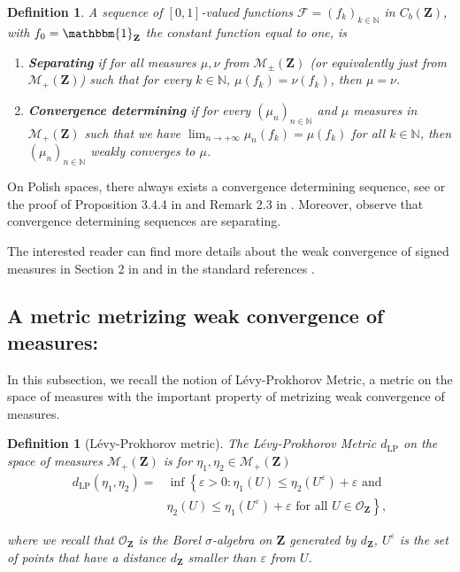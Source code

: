 \documentclass[11pt]{article}
\newtheorem{definition}[theorem]{Definition}
\def\N{\mathbb{N}}
\newcommand{\Space}{\mathbf{Z}}
\newcommand{\Topo}{\mathcal{O}_\Space}
\newcommand{\Meas}{\mathcal{M}_+(\Space)}
\newcommand{\SignedMeas}{\mathcal{M}_{\pm}(\Space)}
\newcommand{\CbFunct}{C_b(\Space)}
\newcommand{\F}{\mathcal{F}}
\newcommand{\un}{\mathbbm{1}}
\begin{document}
\begin{definition}
    A sequence of $[0,1]$-valued functions $\F = (f_k )_{k\in\N}$ in $\CbFunct$, with $f_0=\un_{\mathbf{Z}}$ the constant function equal to one, is    
\begin{enumerate}
\item  \textbf{Separating}   if  for all measures $\mu,\nu$ from $\SignedMeas$ (or equivalently just from  $\Meas$) such that for every $k\in\N$, $\mu(f_k) = \nu(f_k)$, then $\mu = \nu$.
 \item  \textbf{Convergence determining}  if   for  every $(\mu_n)_{n\in\N}$  and  $\mu$   measures  in  $\Meas$  such  that we have $\lim_{n\to +\infty} \mu_n(f_k)  = \mu(f_k)$ for all $k\in\N$, then $(\mu_n )_{n\in\N}$ weakly converges to $\mu$.
\end{enumerate}
\end{definition}
On Polish spaces, there always exists a convergence determining sequence, see \cite[Corollary 2.2.6]{Bogachev} or the proof of Proposition 3.4.4 in \cite{Ethier} and  Remark 2.3 in \cite{abraham2023probabilitygraphons}. Moreover, observe that convergence determining sequences are separating. 

The interested reader can find more details about the weak convergence of signed measures in Section 2 in \cite{abraham2023probabilitygraphons} and in the standard references \cite{Bogachev,BogachevMT1,BogachevMT2,Ethier,MeasurableSetsMeasures,Varadarajan}.

\subsection{A metric metrizing weak convergence of measures:}

 In this subsection, we recall the notion of Lévy-Prokhorov Metric, a metric on the space of measures with the important property of metrizing weak convergence of measures. 
 
\begin{definition}[Lévy-Prokhorov metric]\label{LevyProk}
 The \emph{Lévy-Prokhorov Metric} $d_{\mathrm{LP}}$ on the space of measures $\Meas$ is for $\eta_1,\eta_2\in \Meas$
$$\begin{aligned}
d_{\mathrm{LP}}\left(\eta_{1}, \eta_{2}\right)=&\inf \left\{\varepsilon>0: \eta_{1}(U) \leq \eta_{2}\left(U^{\varepsilon}\right)+\varepsilon \text{ and } \right.\\
&\left.\eta_{2}(U) \leq \eta_{1}\left(U^{\varepsilon}\right)+\varepsilon  \text{ for all } U \in \Topo\right\},
\end{aligned}$$

where we recall that $\Topo$ is the Borel $\sigma$-algebra on $\Space$ generated by $d_{\Space}$, $U^{\varepsilon}$ is the set of points that have a distance $d_{\Space}$ smaller than $\varepsilon$ from $U$.
\end{definition}
\end{document}
